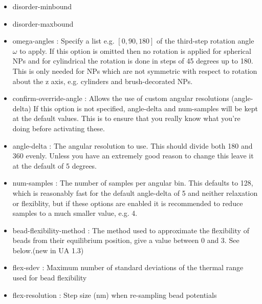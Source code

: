 \documentclass[10pt,a4paper,onecolumn]{report}
\begin{document}
\begin{itemize}
\item disorder-minbound
\item disorder-maxbound
\item omega-angles : Specify a list e.g.  $[0, 90, 180]$ of the third-step rotation angle $\omega$ to apply. If this option is omitted then no rotation is applied for spherical NPs and for cylindrical the rotation is done in steps of 45 degrees up to 180. This is only needed for NPs which are not symmetric with respect to rotation about the z axis, e.g. cylinders and brush-decorated NPs.

\item confirm-override-angle : Allows the use of custom angular resolutions (angle-delta)  If this option is not specified, angle-delta and num-samples will be kept at the default values. This is to ensure that you really know what you're doing before activating these.
\item angle-delta : The angular resolution to use. This should divide both 180 and 360 evenly. Unless you have an extremely good reason to change this leave it at the default of 5 degrees.
\item num-samples : The number of samples per angular bin. This defaults to 128, which is reasonably fast  for the default angle-delta of 5 and neither relaxation or flexiblity, but if these options are enabled it is recommended to reduce samples to a much smaller value, e.g. 4. 

\item bead-flexibility-method : The method used to approximate the flexibility of beads from their equilibrium position, give a value between 0 and 3. See below.(new in UA 1.3) 
\item flex-sdev : Maximum number of standard deviations of the thermal range used for bead flexibility
\item flex-resolution : Step size (nm) when re-sampling bead potentials


\end{itemize}
\end{document}
